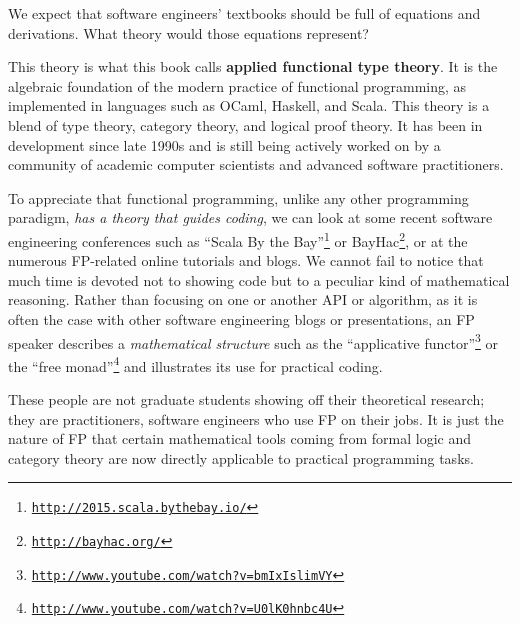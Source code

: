 We expect that software engineers\textsf{'} textbooks should be full
of equations and derivations. What theory would those equations represent?

This theory is what this book calls \textbf{applied functional type
theory}. It is the algebraic
foundation of the modern practice of functional programming, as implemented
in languages such as OCaml, Haskell, and Scala. This theory is a blend
of type theory, category theory, and logical proof theory. It has
been in development since late 1990s and is still being actively worked
on by a community of academic computer scientists and advanced software
practitioners.

To appreciate that functional programming, unlike any other programming
paradigm, \emph{has a theory that guides coding}, we can look at some
recent software engineering conferences such as \textsf{``}Scala By the Bay\textsf{''}\footnote{\texttt{\href{http://2015.scala.bythebay.io/}{http://2015.scala.bythebay.io/}}}
or BayHac\footnote{\texttt{\href{http://bayhac.org/}{http://bayhac.org/}}},
or at the numerous FP-related online tutorials and blogs. We cannot
fail to notice that much time is devoted not to showing code but to
a peculiar kind of mathematical reasoning. Rather than focusing on
one or another API or algorithm, as it is often the case with other
software engineering blogs or presentations, an FP speaker describes
a \emph{mathematical structure} \textemdash{} such as the \textsf{``}applicative
functor\textsf{''}\footnote{\texttt{\href{http://www.youtube.com/watch?v=bmIxIslimVY}{http://www.youtube.com/watch?v=bmIxIslimVY}}}
or the \textsf{``}free monad\textsf{''}\footnote{\texttt{\href{http://www.youtube.com/watch?v=U0lK0hnbc4U}{http://www.youtube.com/watch?v=U0lK0hnbc4U}}}
\textemdash{} and illustrates its use for practical coding.

These people are not graduate students showing off their theoretical
research; they are practitioners, software engineers who use FP on
their jobs. It is just the nature of FP that certain mathematical
tools \textemdash{} coming from formal logic and category theory \textemdash{}
are now directly applicable to practical programming tasks.

